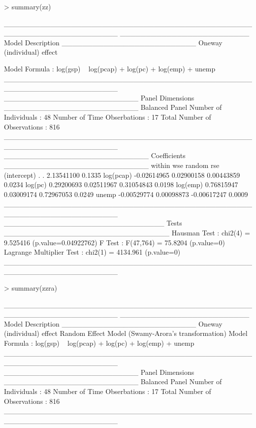 \documentclass{article}
\begin{document}
\begin{Schunk}
\begin{Sinput}
> summary(zz)
\end{Sinput}
\begin{Soutput}
______________________________________________________________________ 
_________________________ Model Description __________________________
Oneway (individual) effect

Model Formula        : log(gsp) ~ log(pcap) + log(pc) + log(emp) + 
                           unemp
______________________________________________________________________ 
__________________________ Panel Dimensions __________________________
Balanced Panel
Number of Individuals        :  48
Number of Time Obserbations  :  17
Total Number of Observations :  816
______________________________________________________________________ 
____________________________ Coefficients ____________________________
                 within         wse      random    rse
(intercept)           .           .  2.13541100 0.1335
log(pcap)   -0.02614965  0.02900158  0.00443859 0.0234
log(pc)      0.29200693  0.02511967  0.31054843 0.0198
log(emp)     0.76815947  0.03009174  0.72967053 0.0249
unemp       -0.00529774  0.00098873 -0.00617247 0.0009
______________________________________________________________________ 
_______________________________ Tests ________________________________
Hausman Test                   : chi2(4) = 9.525416 (p.value=0.04922762)
F Test                         : F(47,764) = 75.8204 (p.value=0)
Lagrange Multiplier Test       : chi2(1) = 4134.961 (p.value=0)
______________________________________________________________________ 
\end{Soutput}
\begin{Sinput}
> summary(zzra)
\end{Sinput}
\begin{Soutput}
______________________________________________________________________ 
_________________________ Model Description __________________________
Oneway (individual) effect
Random Effect Model (Swamy-Arora's transformation)
Model Formula             : log(gsp) ~ log(pcap) + log(pc) + 
                                log(emp) + unemp
______________________________________________________________________ 
__________________________ Panel Dimensions __________________________
Balanced Panel
Number of Individuals        :  48
Number of Time Obserbations  :  17
Total Number of Observations :  816
______________________________________________________________________ 

\end{Soutput}
\end{Schunk}
\end{document}
